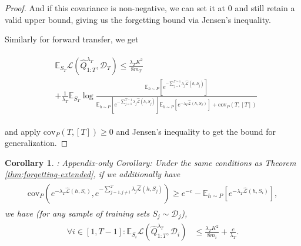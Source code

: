 \documentclass{article}
\theoremstyle{plain}
\newtheorem{corollary}[theorem]{Corollary}
\theoremstyle{definition}
\theoremstyle{remark}
\begin{document}
\begin{proof}
And if this covariance is non-negative, we can set it at $0$ and still retain a valid upper bound, giving us the forgetting bound via Jensen's inequality.

Similarly for forward transfer, we get 

\begin{align} \label{eq-oracle-forward-extend}
\begin{split}
&\mathbb{E}_{S_T}\mathcal{L}(\hat{Q}^{\lambda_T}_{1:T}, \mathcal{D}_T) \leq \frac{\lambda_T K^2}{8m_T}\\&+
\frac{1}{\lambda_T}\mathbb{E}_{S_T}\log\frac{\mathbb{E}_{h\sim P}\left [e^{-\sum_{j=1}^{T-1}\lambda_j\hat{\mathcal{L}}(h,S_j)} \right ]}{\mathbb{E}_{h\sim P}\left [e^{-\sum_{j=1}^{T-1}\lambda_j\hat{\mathcal{L}}(h,S_j)} \right ]\mathbb{E}_{h\sim P}\left [e^{-\lambda_T\hat{\mathcal{L}}(h,S_T)} \right ]+\mathrm{cov}_{P}(T, [T])}
\end{split}
\end{align}

and apply $\mathrm{cov}_{P}(T, [T])\geq 0$ and Jensen's inequality to get the bound for generalization.

\end{proof}


\begin{corollary} \label{thm:oracle-T-highcov}:
    Appendix-only Corollary: Under the same conditions as Theorem \ref{thm:forgetting-extended}, if we additionally have
%
\begin{align*} 
\begin{split}
\mathrm{cov}_{P}(e^{-\lambda_T\hat{\mathcal{L}}(h,S_i)}, e^{-\sum_{j=1,j\neq i}^{T}\lambda_j\hat{\mathcal{L}}(h,S_j)})
 \geq e^{-c}-\mathbb{E}_{h\sim P}\left [e^{-\lambda_T\hat{\mathcal{L}}(h,S_i)} \right ],
\end{split}
\end{align*}
%
we have (for any sample of training sets $S_{j}\sim \mathcal{D}_j$),
%
\begin{align*} 
\begin{split}
\forall i\in[1,T-1]:
\mathbb{E}_{S_i}\mathcal{L}(\hat{Q}^{\lambda_T}_{1:T}, \mathcal{D}_i) &\leq \frac{\lambda_T K^2}{8m_i}+\frac{c}{\lambda_T}.
\end{split}
\end{align*}
\end{corollary}
\end{document}
